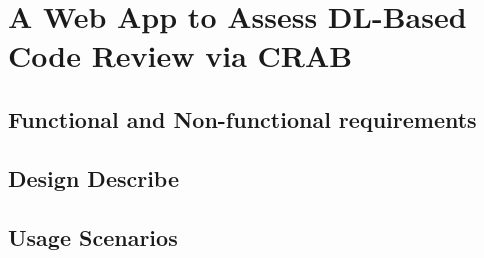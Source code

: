 \section{A Web App to Assess DL-Based Code Review via CRAB}

\subsection{Functional and Non-functional requirements}
\subsection{Design Describe}


\subsection{Usage Scenarios}


